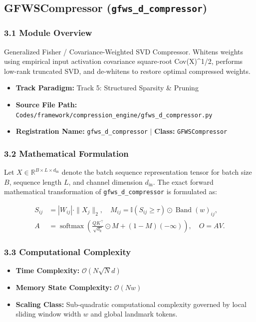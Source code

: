 \subsection{GFWSCompressor (\texttt{gfws\_d\_compressor})}
\label{sec:app_module_gfws_d_compressor}

\subsubsection*{3.1 Module Overview}
Generalized Fisher / Covariance-Weighted SVD Compressor. Whitens weights using empirical input activation covariance square-root Cov(X)^{1/2}, performs low-rank truncated SVD, and de-whitens to restore optimal compressed weights.
\begin{itemize}
    \item \textbf{Track Paradigm:} Track 5: Structured Sparsity & Pruning
    \item \textbf{Source File Path:} \texttt{Codes/framework/compression\_engine/gfws\_d\_compressor.py}
    \item \textbf{Registration Name:} \texttt{gfws\_d\_compressor} $\mid$ \textbf{Class:} \texttt{GFWSCompressor}
\end{itemize}

\subsubsection*{3.2 Mathematical Formulation}
Let $X \in \mathbb{R}^{B \times L \times d_{\text{in}}}$ denote the batch sequence representation tensor for batch size $B$, sequence length $L$, and channel dimension $d_{\text{in}}$. The exact forward mathematical transformation of \texttt{gfws\_d\_compressor} is formulated as:

\begin{align}
S_{ij} &= |W_{ij}| \cdot \|X_j\|_2, \quad M_{ij} = \mathbb{I}(S_{ij} \ge \tau) \odot \operatorname{Band}(w)_{ij}, \\
A &= \operatorname{softmax}\left(\frac{Q K^\top}{\sqrt{d_k}} \odot M + (1 - M)(-\infty)\right), \quad O = A V.
\end{align}


\subsubsection*{3.3 Computational Complexity}
\begin{itemize}
    \item \textbf{Time Complexity:} $\mathcal{O}(N \sqrt{N} d)$
    \item \textbf{Memory State Complexity:} $\mathcal{O}(N w)$
    \item \textbf{Scaling Class:} Sub-quadratic computational complexity governed by local sliding window width $w$ and global landmark tokens.
\end{itemize}

